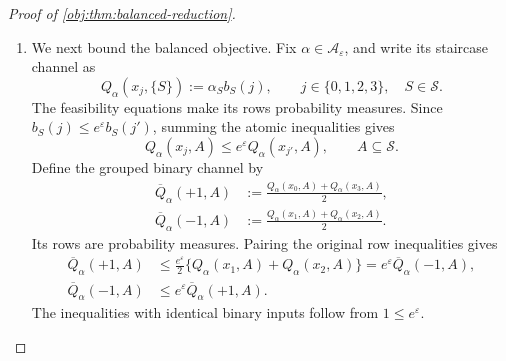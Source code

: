 \begin{proof}[Proof of \cref{obj:thm:balanced-reduction}]
\begin{enumerate}
The contributions from \(S=\{0\}\) and \(S=\{3\}\) satisfy
\[
\begin{aligned}
0\le
\frac{(e^\varepsilon-1)^2t_{\mathrm{sing}}^2}
{4(e^\varepsilon+3)h_{\{0\}}(\theta)}
&\le F_\theta(\alpha^{\mathrm{sing}},t_{\mathrm{sing}}),\\
0\le
\frac{(e^\varepsilon-1)^2(t_{\mathrm{sing}}+1)^2}
{4(e^\varepsilon+3)h_{\{3\}}(\theta)}
&\le F_\theta(\alpha^{\mathrm{sing}},t_{\mathrm{sing}}).
\end{aligned}
\]
Both coefficients are strictly positive. A zero minimum would therefore
force \(t_{\mathrm{sing}}=0\) and \(t_{\mathrm{sing}}+1=0\), a contradiction.
By the definition of \(J^*\),
\[
0<
\min_{t\in\mathbb R}F_\theta(\alpha^{\mathrm{sing}},t)
\le J^*(\theta,1/2,\varepsilon).
\]

\item We next bound the balanced objective. Fix
\(\alpha\in\mathcal A_\varepsilon\), and write its staircase channel as
\[
Q_\alpha(x_j,\{S\})
:=\alpha_S b_S(j),
\qquad j\in\{0,1,2,3\},\quad S\in\mathcal S.
\]
The feasibility equations make its rows probability measures. Since
\(b_S(j)\le e^\varepsilon b_S(j')\), summing the atomic inequalities gives
\[
Q_\alpha(x_j,A)
\le e^\varepsilon Q_\alpha(x_{j'},A),
\qquad A\subseteq\mathcal S.
\]
Define the grouped binary channel by
\[
\begin{aligned}
\overline Q_\alpha(+1,A)
&:=\frac{Q_\alpha(x_0,A)+Q_\alpha(x_3,A)}2,\\
\overline Q_\alpha(-1,A)
&:=\frac{Q_\alpha(x_1,A)+Q_\alpha(x_2,A)}2.
\end{aligned}
\]
Its rows are probability measures. Pairing the original row inequalities
gives
\[
\begin{aligned}
\overline Q_\alpha(+1,A)
&\le \frac{e^\varepsilon}{2}
\{Q_\alpha(x_1,A)+Q_\alpha(x_2,A)\}
=e^\varepsilon\overline Q_\alpha(-1,A),\\
\overline Q_\alpha(-1,A)
&\le e^\varepsilon\overline Q_\alpha(+1,A).
\end{aligned}
\]
The inequalities with identical binary inputs follow from
\(1\le e^\varepsilon\).


\end{enumerate}
\end{proof}
